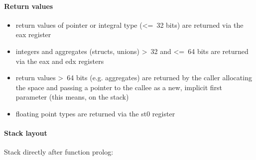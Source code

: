 
\paragraph{Return values}

\begin{itemize}
\item return values of pointer or integral type (\textless=\ 32 bits) are returned via the eax register
\item integers and aggregates (structs, unions) \textgreater\ 32 and \textless=\ 64 bits are returned via the eax and edx registers
\item return values \textgreater\ 64 bits (e.g. aggregates) are returned by the caller allocating the space and
passing a pointer to the callee as a new, implicit first parameter (this means, on the stack)
\item floating point types are returned via the st0 register
\end{itemize}


\paragraph{Stack layout}

Stack directly after function prolog:\\

